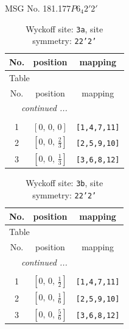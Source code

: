 \documentclass[fleqn,8pt]{jsarticle}
\begin{document}
\setcounter{MaxMatrixCols}{32}

\renewcommand{\tablename}{Table~}
\renewcommand{\figurename}{Figure~}
\begin{center}
\LARGE
MSG No. 181.177\quad$P6_{4}2'2'$
\end{center}
\renewcommand{\arraystretch}{1.2}
\begin{longtable}{ccc}
\caption{Wyckoff site: {\tt 3a}, site symmetry: {\tt 22'2'}}
 \\
 \hline \hline
No. & position & mapping \\ \hline \endfirsthead

\multicolumn{2}{l}{\tablename\ \thetable{}} \\
 \hline \hline
No. & position & mapping \\ \hline \endhead

 \hline \hline
\multicolumn{2}{r}{\footnotesize\it continued ...} \\ \endfoot

 \hline \hline
\multicolumn{2}{r}{} \\ \endlastfoot

1 & $\left[ 0,\, 0,\, 0 \right]$ & {\tt [1,4,7,11]} \\ \hline
2 & $\left[ 0,\, 0,\, \frac{2}{3} \right]$ & {\tt [2,5,9,10]} \\ \hline
3 & $\left[ 0,\, 0,\, \frac{1}{3} \right]$ & {\tt [3,6,8,12]} \\
\end{longtable}
\renewcommand{\arraystretch}{1.2}
\begin{longtable}{ccc}
\caption{Wyckoff site: {\tt 3b}, site symmetry: {\tt 22'2'}}
 \\
 \hline \hline
No. & position & mapping \\ \hline \endfirsthead

\multicolumn{2}{l}{\tablename\ \thetable{}} \\
 \hline \hline
No. & position & mapping \\ \hline \endhead

 \hline \hline
\multicolumn{2}{r}{\footnotesize\it continued ...} \\ \endfoot

 \hline \hline
\multicolumn{2}{r}{} \\ \endlastfoot

1 & $\left[ 0,\, 0,\, \frac{1}{2} \right]$ & {\tt [1,4,7,11]} \\ \hline
2 & $\left[ 0,\, 0,\, \frac{1}{6} \right]$ & {\tt [2,5,9,10]} \\ \hline
3 & $\left[ 0,\, 0,\, \frac{5}{6} \right]$ & {\tt [3,6,8,12]} \\
\end{longtable}
\end{document}
